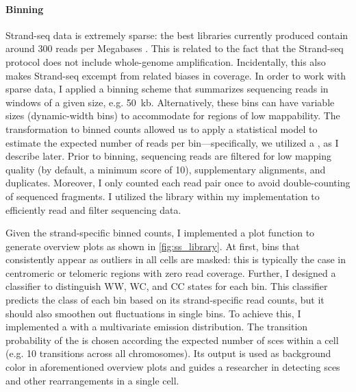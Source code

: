 \paragraph{Binning}
Strand-seq data is extremely sparse: the best libraries currently produced
contain around 300 reads per Megabases \citep{Chaisson2017,Sanders2017}.
This is related to the fact that the Strand-seq protocol does not include
whole-genome amplification. Incidentally, this also makes Strand-seq excempt
from related biases in coverage. In
order to work with sparse data, I applied a binning scheme that summarizes
sequencing reads in windows of a given size, e.g. 50~kb. Alternatively, these
bins can have variable sizes (dynamic-width bins) to accommodate for regions of
low mappability. The transformation to binned counts allowed us to apply a
statistical model to estimate the expected number of reads per
bin---specifically, we utilized a ,
as I describe
later. Prior to binning, sequencing reads are filtered for low mapping quality
(by default, a minimum score of 10), supplementary alignments, and \pcr duplicates.
Moreover, I only counted each read pair once to avoid double-counting of
sequenced fragments. I utilized the \htslib library within my implementation
to efficiently read and filter sequencing data.

Given the strand-specific binned counts, I implemented a plot function to
generate overview plots as shown in \cref{fig:ss_library}. At first, bins that
consistently appear as outliers in all cells are masked: this is typically the
case in centromeric or telomeric regions with zero read coverage. Further, I designed a classifier to
distinguish WW, WC, and CC states for each bin. This classifier predicts
the class of each bin based on its strand-specific read counts, but it
should also smoothen out fluctuations in single bins.
To achieve this, I implemented a \hmm with a multivariate \nb
emission distribution. The transition probability of the \hmm is chosen
according the expected number of \acp{sce} within a cell (e.g. 10 transitions
across all chromosomes). Its output is used as background color in
aforementioned overview plots and guides a researcher in detecting \acp{sce} and
other rearrangements in a single cell.

